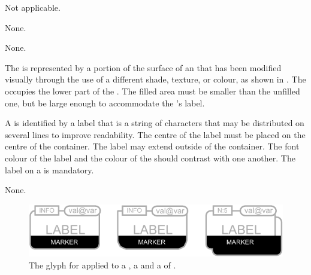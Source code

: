 \begin{glyphDescription}

\glyphSboTerm Not applicable.


\glyphIncoming
None.



\glyphOutgoing
None.


\glyphContainer
The  is represented by a portion of the surface of an  that has been modified visually through the use of a different shade, texture, or colour, as shown in .
The  occupies the lower part of the .
The filled area must be smaller than the unfilled one, but be large enough to accommodate the 's label.

\glyphLabel
A  is identified by a label that is  a string of characters that may be distributed on several lines to improve readability.
The centre of the label must be placed on the centre of the container.
The label may extend outside of the container.
The font colour of the label and the colour of the  should contrast with one another.
The label on a  is mandatory.

\glyphAux
None.

\end{glyphDescription}

\begin{figure}[H]
  \centering
  \includegraphics{images/labeledCloneMarker}
  \caption{The \PD glyph for  applied to a , a  and a  of .}
  \label{fig:labelledCloneMarker}
\end{figure}

